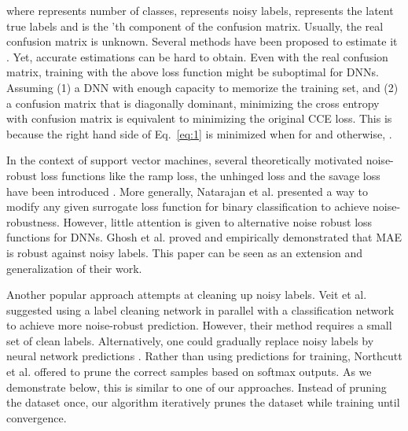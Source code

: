 \documentclass{article}
\begin{document}
where  represents number of classes,  represents noisy labels,  represents the latent true labels and  is the 'th component of the confusion matrix. 
Usually, the real confusion matrix is unknown. 
Several methods have been proposed to estimate it \cite{goldberger2016training, hendrycks2018using, patrini2017making, jindal2016learning, han2018masking}.
Yet, accurate estimations can be hard to obtain. 
Even with the real confusion matrix, training with the above loss function might be suboptimal for DNNs. 
Assuming (1) a DNN with enough capacity to memorize the training set, and (2) a confusion matrix that is diagonally dominant, minimizing the cross entropy with confusion matrix is equivalent to minimizing the original CCE loss.
This is because the right hand side of Eq.~\ref{eq:1} is minimized when  for  and  otherwise,  .     
 
In the context of support vector machines, several theoretically motivated noise-robust loss functions like the ramp loss, the unhinged loss and the savage loss have been introduced \cite{brooks2011support,van2015learning,masnadi2009design}. More generally, Natarajan et al. \cite{natarajan2013learning} presented a way to modify any given surrogate loss function for binary classification to achieve noise-robustness. However, little attention is given to alternative noise robust loss functions for DNNs. Ghosh et al. \cite{ghosh2015making,ghosh2017robust} proved and empirically demonstrated that MAE is robust against noisy labels.
This paper can be seen as an extension and generalization of their work.
 
Another popular approach attempts at cleaning up noisy labels. 
Veit et al. \cite{veit2017learning} suggested using a label cleaning network in parallel with a classification network to achieve more noise-robust prediction. 
However, their method requires a small set of clean labels. 
Alternatively, one could gradually replace noisy labels by neural network predictions \cite{reed2014training,tanaka2018joint}. 
Rather than using predictions for training, Northcutt et al. \cite{northcutt2017learning} offered to prune the correct samples based on softmax outputs. 
As we demonstrate below, this is similar to one of our approaches. 
Instead of pruning the dataset once, our algorithm iteratively prunes the dataset while training until convergence. 
\end{document}
